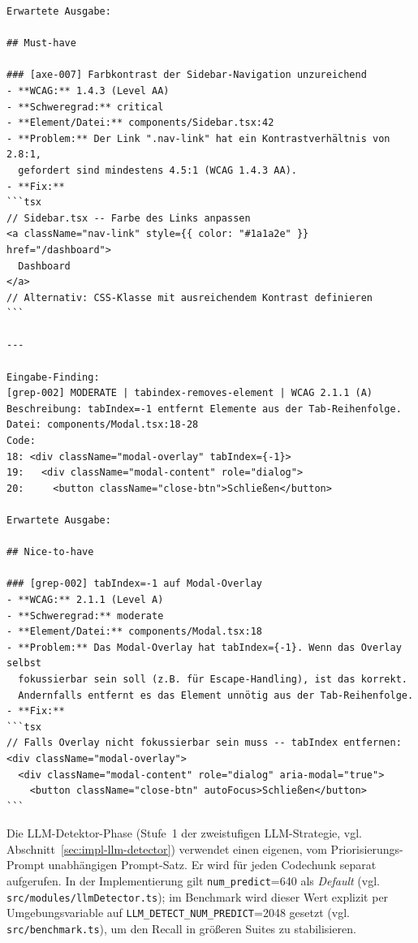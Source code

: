 \begin{lstlisting}[language={}, caption={Vollständiger System-Prompt des \ac{ACE}-Assistenzsystems (aus \texttt{src/prompt.ts})}, label={lst:systemprompt}, basicstyle=\ttfamily\scriptsize, breaklines=true]
Erwartete Ausgabe:

## Must-have

### [axe-007] Farbkontrast der Sidebar-Navigation unzureichend
- **WCAG:** 1.4.3 (Level AA)
- **Schweregrad:** critical
- **Element/Datei:** components/Sidebar.tsx:42
- **Problem:** Der Link ".nav-link" hat ein Kontrastverhältnis von 2.8:1,
  gefordert sind mindestens 4.5:1 (WCAG 1.4.3 AA).
- **Fix:**
```tsx
// Sidebar.tsx -- Farbe des Links anpassen
<a className="nav-link" style={{ color: "#1a1a2e" }} href="/dashboard">
  Dashboard
</a>
// Alternativ: CSS-Klasse mit ausreichendem Kontrast definieren
```

---

Eingabe-Finding:
[grep-002] MODERATE | tabindex-removes-element | WCAG 2.1.1 (A)
Beschreibung: tabIndex=-1 entfernt Elemente aus der Tab-Reihenfolge.
Datei: components/Modal.tsx:18-28
Code:
18: <div className="modal-overlay" tabIndex={-1}>
19:   <div className="modal-content" role="dialog">
20:     <button className="close-btn">Schließen</button>

Erwartete Ausgabe:

## Nice-to-have

### [grep-002] tabIndex=-1 auf Modal-Overlay
- **WCAG:** 2.1.1 (Level A)
- **Schweregrad:** moderate
- **Element/Datei:** components/Modal.tsx:18
- **Problem:** Das Modal-Overlay hat tabIndex={-1}. Wenn das Overlay selbst
  fokussierbar sein soll (z.B. für Escape-Handling), ist das korrekt.
  Andernfalls entfernt es das Element unnötig aus der Tab-Reihenfolge.
- **Fix:**
```tsx
// Falls Overlay nicht fokussierbar sein muss -- tabIndex entfernen:
<div className="modal-overlay">
  <div className="modal-content" role="dialog" aria-modal="true">
    <button className="close-btn" autoFocus>Schließen</button>
```
\end{lstlisting}

\clearpage
{}\label{app:detektorprompt}

Die \ac{LLM}-Detektor-Phase (Stufe~1 der zweistufigen \ac{LLM}-Strategie, vgl. Abschnitt~\ref{sec:impl-llm-detector}) verwendet einen eigenen, vom Priorisierungs-Prompt unabhängigen Prompt-Satz. Er wird für jeden Codechunk separat aufgerufen. In der Implementierung gilt \texttt{num\_predict}=640 als \textit{Default} (vgl. \texttt{src/modules/llmDetector.ts}); im Benchmark wird dieser Wert explizit per Umgebungsvariable auf \texttt{LLM\_DETECT\_NUM\_PREDICT}=2048 gesetzt (vgl. \texttt{src/benchmark.ts}), um den Recall in größeren Suites zu stabilisieren.

